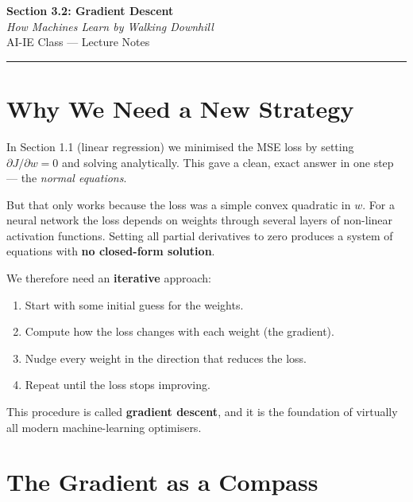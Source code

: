 \documentclass[12pt, a4paper]{article}
\begin{document}
\begin{center}
  {\LARGE \textbf{Section 3.2: Gradient Descent}} \\[0.3em]
  {\large\itshape How Machines Learn by Walking Downhill} \\[0.5em]
  {\large AI-IE Class --- Lecture Notes}%
  \ifstudentmode
  \fi
\end{center}

\vspace{1em}
\hrule
\vspace{1.5em}

\section{Why We Need a New Strategy}

In Section 1.1 (linear regression) we minimised the MSE loss by setting
$\partial J/\partial w = 0$ and solving analytically.  This gave a clean,
exact answer in one step --- the \emph{normal equations}.

But that only works because the loss was a simple convex quadratic in $w$.
For a neural network the loss depends on weights through several layers of
non-linear activation functions.  Setting all partial derivatives to zero
produces a system of equations with \textbf{no closed-form solution}.

We therefore need an \textbf{iterative} approach:
\begin{enumerate}[nosep]
  \item Start with some initial guess for the weights.
  \item Compute how the loss changes with each weight (the gradient).
  \item Nudge every weight in the direction that reduces the loss.
  \item Repeat until the loss stops improving.
\end{enumerate}

This procedure is called \textbf{gradient descent}, and it is the foundation
of virtually all modern machine-learning optimisers.

\section{The Gradient as a Compass}
\end{document}
